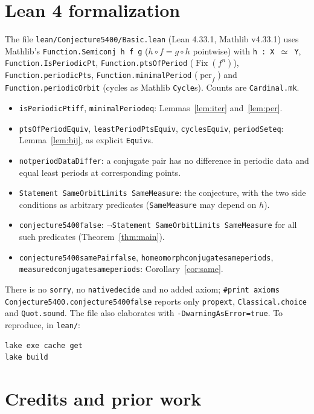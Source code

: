 \documentclass[11pt]{article}
\theoremstyle{definition}
\theoremstyle{remark}
\renewcommand{\_}{\oldus\allowbreak}
\newcommand{\Fix}{\operatorname{Fix}}
\newcommand{\per}{\operatorname{per}}
\begin{document}
\section{Lean 4 formalization}

The file \texttt{lean/Conjecture5400/Basic.lean} (Lean 4.33.1, Mathlib v4.33.1) uses Mathlib's
\texttt{Function.Semiconj h f g} ($h\circ f=g\circ h$ pointwise) with \texttt{h : X $\simeq$ Y},
\texttt{Function.IsPeriodicPt}, \texttt{Function.ptsOfPeriod} ($\Fix(f^n)$),
\texttt{Function.periodicPts}, \texttt{Function.minimalPeriod} ($\per_f$) and
\texttt{Function.periodicOrbit} (cycles as Mathlib \texttt{Cycle}s). Counts are \texttt{Cardinal.mk}.

\begin{itemize}[leftmargin=*]
\item \texttt{isPeriodicPt\_iff}, \texttt{minimalPeriod\_eq}: Lemmas~\ref{lem:iter} and~\ref{lem:per}.
\item \texttt{ptsOfPeriodEquiv}, \texttt{leastPeriodPtsEquiv}, \texttt{cyclesEquiv},
\texttt{periodSet\_eq}: Lemma~\ref{lem:bij}, as explicit \texttt{Equiv}s.
\item \texttt{not\_periodDataDiffer}: a conjugate pair has no difference in periodic data and equal
least periods at corresponding points.
\item \texttt{Statement SameOrbitLimits SameMeasure}: the conjecture, with the two side conditions as
arbitrary predicates (\texttt{SameMeasure} may depend on $h$).
\item \texttt{conjecture5400\_false}: $\neg$\texttt{Statement SameOrbitLimits SameMeasure} for all
such predicates (Theorem~\ref{thm:main}).
\item \texttt{conjecture5400\_samePair\_false}, \texttt{homeomorph\_conjugate\_same\_periods},
\texttt{measured\_conjugate\_same\_periods}: Corollary~\ref{cor:same}.
\end{itemize}

There is no \texttt{sorry}, no \texttt{native\_decide} and no added axiom;
\texttt{\#print axioms Conjecture5400.conjecture5400\_false} reports only \texttt{propext},
\texttt{Classical.choice} and \texttt{Quot.sound}. The file also elaborates with
\texttt{-DwarningAsError=true}. To reproduce, in \texttt{lean/}:
\begin{verbatim}
lake exe cache get
lake build
\end{verbatim}

\section{Credits and prior work}
\end{document}
